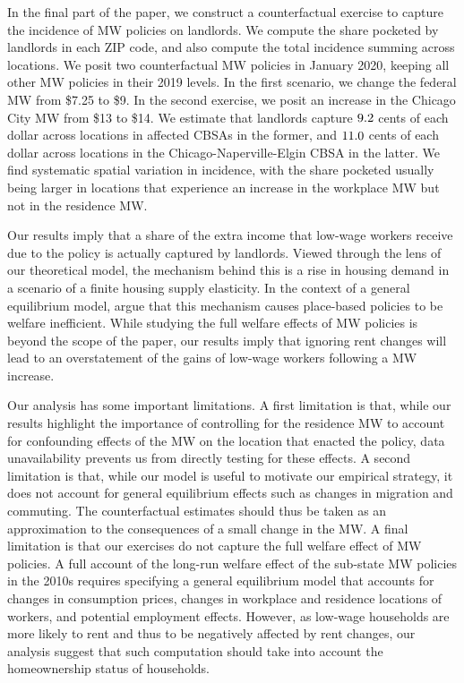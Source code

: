
In the final part of the paper, we construct a counterfactual exercise to 
capture the incidence of MW policies on landlords.
We compute the share pocketed by landlords in each ZIP code, and also
compute the total incidence summing across locations.
We posit two counterfactual MW policies in January 2020, keeping all other
MW policies in their 2019 levels.
In the first scenario, we change the federal MW from \$7.25 to \$9.
In the second exercise, we posit an increase in the Chicago City MW 
from \$13 to \$14.
We estimate that landlords capture $\textnormal{9.2}$ cents of each 
dollar across locations in affected CBSAs in the former, and 
$\textnormal{11.0}$ cents of each dollar across locations in the 
Chicago-Naperville-Elgin CBSA in the latter.
We find systematic spatial variation in incidence,
with the share pocketed usually being larger in locations that experience an
increase in the workplace MW but not in the residence MW.

Our results imply that a share of the extra income that low-wage workers
receive due to the policy is actually captured by landlords.
Viewed through the lens of our theoretical model,
the mechanism behind this is a rise in housing demand in a scenario of a 
finite housing supply elasticity.
In the context of a general equilibrium model, \textcite{KlineMoretti2014} argue
that this mechanism causes place-based policies to be welfare inefficient.
While studying the full welfare effects of MW policies is beyond the scope of 
the paper, our results imply that ignoring rent changes will lead to an 
overstatement of the gains of low-wage workers following a MW increase.


Our analysis has some important limitations.
A first limitation is that, while our results highlight the importance of 
controlling for the residence MW to account for confounding effects of the MW
on the location that enacted the policy, data unavailability prevents us from
directly testing for these effects.
A second limitation is that, while our model is useful to motivate our 
empirical strategy, it does not account for general equilibrium effects such 
as changes in migration and commuting.
The counterfactual estimates should thus be taken as an approximation to the 
consequences of a small change in the MW.
A final limitation is that our exercises do not capture the full welfare 
effect of MW policies.
A full account of the long-run welfare effect of the sub-state MW policies in 
the 2010s requires specifying a general equilibrium model that accounts for 
changes in consumption prices, changes in workplace and residence locations
of workers, and potential employment effects.
However, as low-wage households are more likely to rent and thus to be 
negatively affected by rent changes, our analysis suggest that such computation 
should take into account the homeownership status of households.

